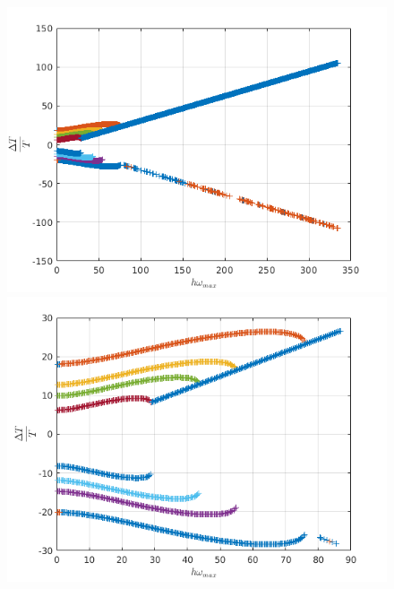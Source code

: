 \begin{itemize}
\begin{figure}[H]
\centering
\begin{minipage}{.5\textwidth}
  \centering
  \includegraphics[width=1.\linewidth]{images/rel_per_err_pml_imp_10.png}
\end{minipage}%
\begin{minipage}{.5\textwidth}
  \centering
  \includegraphics[width=1.\linewidth]{images/rel_per_err_pml_imp_10_80.png}
\end{minipage}%
\label{fig:rel_per_err_pml_imp_10}
\end{figure}


\end{itemize}
